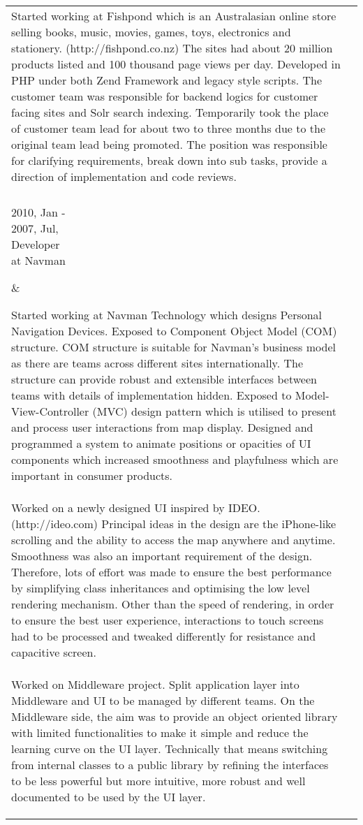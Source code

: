 \begin{resume}
\begin{tabular}{ll}
{Started working at Fishpond which is an Australasian online store selling books, music, movies, games, toys, electronics and stationery. (http://fishpond.co.nz) The sites had about 20 million products listed and 100 thousand page views per day. Developed in PHP under both Zend Framework and legacy style scripts. The customer team was responsible for backend logics for customer facing sites and Solr search indexing. Temporarily took the place of customer team lead for about two to three months due to the original team lead being promoted. The position was responsible for clarifying requirements, break down into sub tasks, provide a direction of implementation and code reviews.

}\\\\
\parbox[t]{30mm}{2010, Jan - \\ 2007, Jul,\\Developer\\at Navman} & \parbox[t]{116mm}{

Started working at Navman Technology which designs Personal Navigation Devices. Exposed to Component Object Model (COM) structure. COM structure is suitable for Navman's business model as there are teams across different sites internationally. The structure can provide robust and extensible interfaces between teams with details of implementation hidden. Exposed to Model-View-Controller (MVC) design pattern which is utilised to present and process user interactions from map display. Designed and programmed a system to animate positions or opacities of UI components which increased smoothness and playfulness which are important in consumer products.
\\\\
Worked on a newly designed UI inspired by IDEO. (http://ideo.com) Principal ideas in the design are the iPhone-like scrolling and the ability to access the map anywhere and anytime. Smoothness was also an important requirement of the design. Therefore, lots of effort was made to ensure the best performance by simplifying class inheritances and optimising the low level rendering mechanism. Other than the speed of rendering, in order to ensure the best user experience, interactions to touch screens had to be processed and tweaked differently for resistance and capacitive screen.
\\\\
Worked on Middleware project. Split application layer into Middleware and UI to be managed by different teams. On the Middleware side, the aim was to provide an object oriented library with limited functionalities to make it simple and reduce the learning curve on the UI layer. Technically that means switching from internal classes to a public library by refining the interfaces to be less powerful but more intuitive, more robust and well documented to be used by the UI layer.

}
\end{tabular}
\end{resume}
